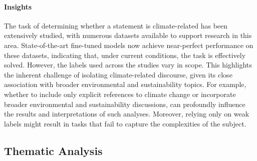 \paragraph{Insights} %
The task of determining whether a statement is climate-related has been extensively studied, with numerous datasets available to support research in this area. State-of-the-art fine-tuned models now achieve near-perfect performance on these datasets, indicating that, under current conditions, the task is effectively solved.
However, the labels used across the studies vary in scope. 
This highlights the inherent challenge of isolating climate-related discourse, given its close association with broader environmental and sustainability topics.
For example, whether to include only explicit references to climate change or incorporate broader environmental and sustainability discussions, can profoundly influence the results and interpretations of such analyses.
Moreover, relying only on weak labels might result in tasks that 
fail to capture the complexities of the subject.



\subsection{Thematic Analysis}
\label{sec:sub-topics}



